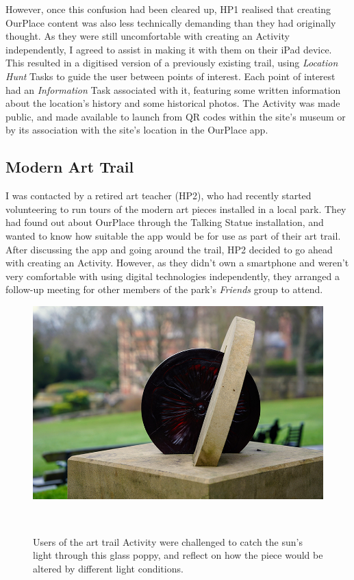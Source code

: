 However, once this confusion had been cleared up, HP1 realised that creating OurPlace content was also less technically demanding than they had originally thought. As they were still uncomfortable with creating an Activity independently, I agreed to assist in making it with them on their iPad device. This resulted in a digitised version of a previously existing trail, using \textit{Location Hunt} Tasks to guide the user between points of interest. Each point of interest had an \textit{Information} Task associated with it, featuring some written information about the location's history and some historical photos. The Activity was made public, and made available to launch from QR codes within the site's museum or by its association with the site's location in the OurPlace app.

\subsection{Modern Art Trail}
\label{sec:ModernArtTrail}

I was contacted by a retired art teacher (HP2), who had recently started volunteering to run tours of the modern art pieces installed in a local park. They had found out about OurPlace through the Talking Statue installation, and wanted to know how suitable the app would be for use as part of their art trail. After discussing the app and going around the trail, HP2 decided to go ahead with creating an Activity. However, as they didn't own a smartphone and weren't very comfortable with using digital technologies independently, they arranged a follow-up meeting for other members of the park's \textit{Friends} group to attend.

\begin{figure}
  \centering
  \includegraphics[width=0.7\columnwidth]{images/chapter06/artpiece.jpg}
  \caption[An art piece which was used in an OurPlace Task]{Users of the art trail Activity were challenged to catch the sun's light through this glass poppy, and reflect on how the piece would be altered by different light conditions.}~\label{fig:ParkArt}
\end{figure}

